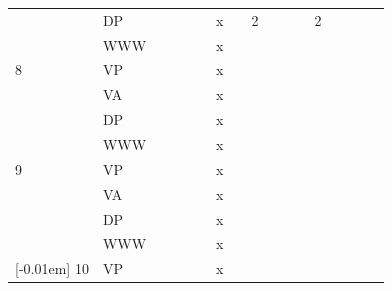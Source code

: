 \documentclass[FP,DP]{tulthesis}
\begin{document}
{{{{{{{\begin{table}[]
\begin{tabular}{@{}|C{0.5cm}|C{1cm}|C{0.7cm}|C{0.6cm}|C{0.6cm}|C{0.7cm}|C{0.7cm}|C{0.6cm}|C{0.6cm}|C{0.6cm}|C{0.7cm}|C{0.7cm}|C{0.7cm}|C{0.7cm}|C{0.7cm}|C{0.7cm}|C{0.7cm}|@{}}
  & DP  &         &        &       &        &  x       &            &   2         &            &            &          & 2       &         &        &         &          \\
  & WWW &         &        &       &        & x        &           &           &            &            &          &         &         &        &         &      \\    
8 & VP  &         &        &       &        & x        &           &           &            &            &          &        &         &        &         &          \\
  & VA  &         &        &       &        & x        &           &           &            &            &          &        &         &           &         &          \\
  & DP  &         &        &       &        &    x     &           &           &            &            &          &        &         &         &         &          \\
  & WWW &         &        &       &        & x        &           &           &            &            &          &        &         &        &         &      \\   
9 & VP  &         &        &       &        &   x      &           &           &            &            &          &        &         &        &         &          \\
  & VA  &             &        &       &        &x         &           &           &            &            &          &         &         &        &         &          \\
  & DP  &         &        &       &        & x        &           &           &            &            &          &        &         &        &         &          \\
  & WWW &         &        &       &        &        x &           &           &            &            &          &        &         &        &         &      \\    
[-0.01em] {10}  & VP  &         &        &       &        &        x &           &           &            &            &          &        &         &        &         &          \\

\end{tabular}
\end{table}}}}}}}}
\end{document}
